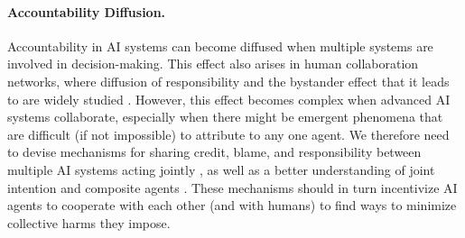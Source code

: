 \paragraph{Accountability Diffusion.}
Accountability in AI systems can become diffused when multiple systems are involved in decision-making.
This effect also arises in human collaboration networks, where diffusion of responsibility and the bystander effect that it leads to are widely studied \citep{darley1968bystander,alechina2017causality}.
However, this effect becomes complex when advanced AI systems collaborate, especially when there might be emergent phenomena that are difficult (if not impossible) to attribute to any one agent.
We therefore need to devise mechanisms for sharing credit, blame, and responsibility between multiple AI systems acting jointly \citep{de2008impartial,friedenberg2019blameworthiness}, as well as a better understanding of joint intention \citep{Friedenberg2023,Jennings1993} and composite agents \citep[see also ]{}.
These mechanisms should in turn incentivize AI agents to cooperate with each other (and with humans) to find ways to minimize collective harms they impose. 

